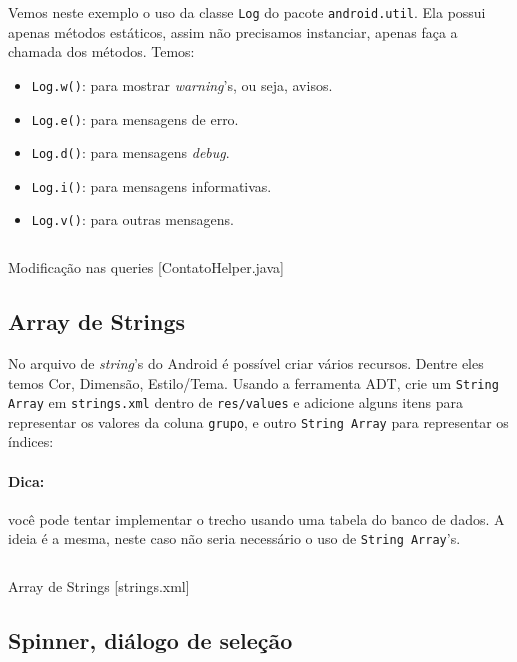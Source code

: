 Vemos neste exemplo o uso da classe \texttt{Log} do pacote
\texttt{android.util}. Ela possui apenas métodos estáticos, assim não
precisamos instanciar, apenas faça a chamada dos métodos. Temos:

\begin{itemize}
\item
  \texttt{Log.w()}: para mostrar \emph{warning}'s, ou seja, avisos.
\item
  \texttt{Log.e()}: para mensagens de erro.
\item
  \texttt{Log.d()}: para mensagens \emph{debug}.
\item
  \texttt{Log.i()}: para mensagens informativas.
\item
  \texttt{Log.v()}: para outras mensagens.
\end{itemize}
\begin{listing}[H]
  \inputminted[linenos=true,frame=bottomline,tabsize=3]{ java }{ source/ContatoHelper-7.java }
  \caption{Modificação nas queries [ContatoHelper.java]}
\end{listing}

\subsection{Array de Strings}

No arquivo de \emph{string}'s do Android é possível criar vários
recursos. Dentre eles temos Cor, Dimensão, Estilo/Tema. Usando a
ferramenta ADT, crie um \texttt{String Array} em \texttt{strings.xml}
dentro de \texttt{res/values} e adicione alguns itens para representar
os valores da coluna \texttt{grupo}, e outro \texttt{String Array} para
representar os índices:

\paragraph{Dica:}

você pode tentar implementar o trecho usando uma tabela do banco de
dados. A ideia é a mesma, neste caso não seria necessário o uso de
\texttt{String Array}'s.

\begin{listing}[H]
  \inputminted[linenos=true,frame=bottomline,tabsize=3]{ xml }{ source/strings-1.xml }
  \caption{Array de Strings [strings.xml]}
\end{listing}

\subsection{Spinner, diálogo de seleção}

